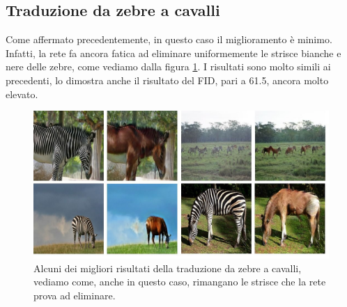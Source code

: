 \subsection{Traduzione da zebre a cavalli}
Come affermato precedentemente, in questo caso il miglioramento è minimo. Infatti, la rete fa ancora fatica ad eliminare uniformemente le strisce bianche e nere delle zebre, come vediamo dalla figura \ref{fig:Risultati cavalli GradCam}. I risultati sono molto simili ai precedenti, lo dimostra anche il risultato del FID, pari a 61.5, ancora molto elevato.
\begin{figure}[H]
\begin{center}
\includegraphics[width=1\columnwidth]{images/image (2).jpeg} 
\end{center}
\caption{Alcuni dei migliori risultati della traduzione da zebre a cavalli, vediamo come, anche in questo caso, rimangano le strisce che la rete prova ad eliminare.}
\label{fig:Risultati cavalli GradCam}
\end{figure} 

